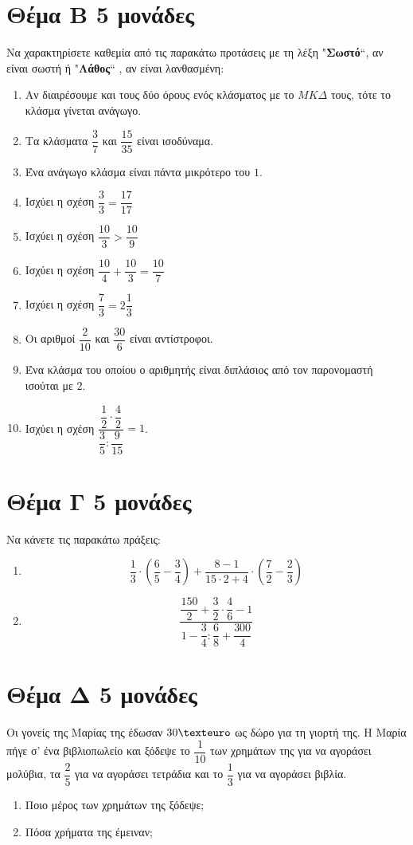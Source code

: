 \documentclass[a4paper,11pt]{report}
\begin{document}
\section*{Θέμα Β \hfill \small{5 μονάδες}}
Να χαρακτηρίσετε καθεμία από τις παρακάτω προτάσεις με τη λέξη "\textbf{Σωστό}``, αν είναι σωστή ή  
"\textbf{Λάθος}`` , αν είναι λανθασμένη:
\begin{enumerate}[1)]
 \item Αν διαιρέσουμε και τους δύο όρους ενός κλάσματος με το $ΜΚΔ$ τους, τότε το κλάσμα γίνεται ανάγωγο.
 \item Τα κλάσματα $\dfrac{3}{7}$ και $\dfrac{15}{35}$ είναι ισοδύναμα.
 \item Ένα ανάγωγο κλάσμα είναι πάντα μικρότερο του $1$.
 \item Ισχύει η σχέση $\dfrac{3}{3}=\dfrac{17}{17}$
 \item Ισχύει η σχέση $\dfrac{10}{3}>\dfrac{10}{9}$
 \item Ισχύει η σχέση $\dfrac{10}{4}+\dfrac{10}{3}=\dfrac{10}{7}$
 \item Ισχύει η σχέση $\dfrac{7}{3}=2\dfrac{1}{3}$
 \item Οι αριθμοί $\dfrac{2}{10}$ και $\dfrac{30}{6}$ είναι αντίστροφοι.
 \item Ένα κλάσμα του οποίου ο αριθμητής είναι διπλάσιος από τον παρονομαστή ισούται με $2$.
 \item Ισχύει η σχέση $\dfrac{\dfrac{1}{2}\cdot \dfrac{4}{2}}{\dfrac{3}{5}:\dfrac{9}{15}}=1$.
\end{enumerate}


\section*{Θέμα Γ \hfill \small{5 μονάδες}}
Να κάνετε τις παρακάτω πράξεις:
\begin{enumerate}[1)]
 \item $$ \dfrac{1}{3}\cdot (\dfrac{6}{5}-\dfrac{3}{4})+\dfrac{8-1}{15\cdot2+4}\cdot (\dfrac{7}{2}-\dfrac{2}{3}) $$
 \item $$ \dfrac{\dfrac{150}{2}+\dfrac{3}{2}\cdot \dfrac{4}{6}-1}{1-\dfrac{3}{4}:\dfrac{6}{8}+\dfrac{300}{4}}  $$
\end{enumerate}

\section*{Θέμα Δ \hfill \small{5 μονάδες}}
Οι γονείς της Μαρίας της έδωσαν $30\texteuro$ ως δώρο για τη γιορτή της. Η Μαρία πήγε σ' ένα βιβλιοπωλείο 
και ξόδεψε το $\dfrac{1}{10}$ των χρημάτων της για να αγοράσει μολύβια, τα $\dfrac{2}{5}$ για να αγοράσει 
τετράδια και το $\dfrac{1}{3}$ για να αγοράσει βιβλία.
\begin{enumerate}[1)]
 \item Ποιο μέρος των χρημάτων της ξόδεψε;
 \item Πόσα χρήματα της έμειναν;
\end{enumerate}
\end{document}
